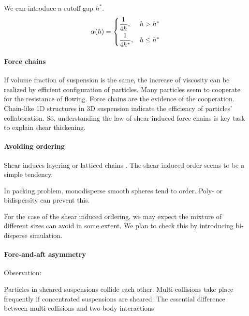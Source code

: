 \documentclass[11pt]{scrartcl}
\begin{document}
We can introduce a cutoff gap $h^{\ast}$.
\begin{equation}
 \alpha(h) =
\begin{dcases}
\displaystyle \frac{1}{4h} , & h > h^{\ast} \\
\displaystyle  \frac{1}{4h^{\ast}} , & h \leq h^{\ast} 
\end{dcases}
\end{equation}


\paragraph{Force chains}

If volume fraction of suspension is the same,
the increase of viscosity can be realized
by efficient configuration of particles.
%
Many particles seem to cooperate for the resistance of flowing.
%
Force chains are the evidence of the cooperation.
%
Chain-like 1D structures in 3D suspension
indicate the efficiency of particles' collaboration.
%
So, understanding the law of shear-induced force chains
is key task to explain shear thickening.

\paragraph{Avoiding ordering}

Shear induces layering or latticed chains \citep{Catherall_2000}.
%
The shear induced order seems to be a simple tendency.
%

In packing problem,
monodisperse smooth spheres tend to order.
%
Poly- or bidispersity can prevent this.

For the case of the shear induced ordering,
we may expect the mixture of different sizes can avoid in some extent.
%
We plan to check this by introducing bi-disperse simulation.
%

\paragraph{Fore-and-aft asymmetry}

\citet{Parsi_1987}


Observation:

Particles in sheared suspensions collide each other.
%
Multi-collisions take place frequently
if concentrated suspensions are sheared.
%
The essential difference 
between multi-collisions and two-body interactions
\end{document}
